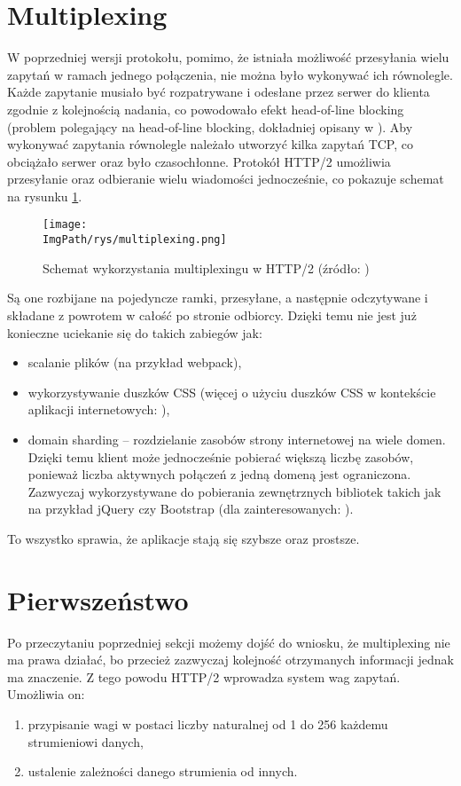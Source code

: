 \documentclass[a4paper,12pt,twoside,openany]{report}
\newcommand{\ImgPath}{.}
\begin{document}
\section{Multiplexing}
\label{sectionMultiplexing}
W poprzedniej wersji protokołu, pomimo, że istniała możliwość przesyłania wielu zapytań w ramach jednego połączenia, nie można było wykonywać ich równolegle.
Każde zapytanie musiało być rozpatrywane i odesłane przez serwer do klienta zgodnie z kolejnością nadania, co powodowało efekt head-of-line blocking (problem polegający na head-of-line blocking, dokładniej opisany w \cite{hol}).
Aby wykonywać zapytania równolegle należało utworzyć kilka zapytań TCP, co obciążało serwer oraz było czasochłonne.
Protokół HTTP/2 umożliwia przesyłanie oraz odbieranie wielu wiadomości jednocześnie, co pokazuje schemat na rysunku \ref{schematMultiplexing}.
\begin{figure}[!htbp]
	\begin{center}
\centering
\texttt{[image: \\ImgPath/rys/multiplexing.png]}
\end{center}
	\caption{Schemat wykorzystania multiplexingu w HTTP/2 (źródło: \cite{http2Fundamentals})}
	\label{schematMultiplexing}
\end{figure}
Są one rozbijane na pojedyncze ramki, przesyłane, a następnie odczytywane i składane z powrotem w całość po stronie odbiorcy.
Dzięki temu nie jest już konieczne uciekanie się do takich zabiegów jak:
\begin{itemize}
	\item scalanie plików (na przykład webpack),
	\item  wykorzystywanie duszków CSS (więcej o użyciu duszków CSS w kontekście aplikacji internetowych: \cite{sprites}),
	\item domain sharding -- rozdzielanie zasobów strony internetowej na wiele domen.
	Dzięki temu klient może jednocześnie pobierać większą liczbę zasobów, ponieważ liczba aktywnych połączeń z jedną domeną jest ograniczona.
	Zazwyczaj wykorzystywane do pobierania zewnętrznych bibliotek takich jak na przykład jQuery czy Bootstrap (dla zainteresowanych: \cite{domainSharding}).
\end{itemize}
To wszystko sprawia, że aplikacje stają się szybsze oraz prostsze.

\section{Pierwszeństwo}

Po przeczytaniu poprzedniej sekcji możemy dojść do wniosku, że multiplexing nie ma prawa działać, bo przecież zazwyczaj kolejność otrzymanych informacji jednak ma znaczenie.
Z tego powodu HTTP/2 wprowadza system wag zapytań.
Umożliwia on:
\begin{enumerate}
	\item przypisanie wagi w postaci liczby naturalnej od 1 do 256 każdemu strumieniowi danych,
	\item ustalenie zależności danego strumienia od innych.
\end{enumerate}
\end{document}
